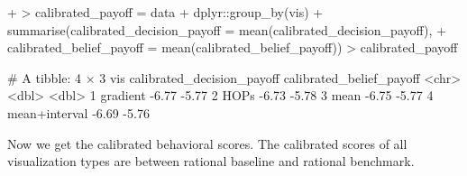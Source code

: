 \documentclass{article}
\begin{document}
\begin{Schunk}
\begin{Sinput}
{+ }
> calibrated_payoff = data %>%
+   dplyr::group_by(vis) %>%
+   summarise(calibrated_decision_payoff = mean(calibrated_decision_payoff),
+             calibrated_belief_payoff = mean(calibrated_belief_payoff))
> calibrated_payoff
\end{Sinput}
\begin{Soutput}
# A tibble: 4 × 3
  vis           calibrated_decision_payoff calibrated_belief_payoff
  <chr>                              <dbl>                    <dbl>
1 gradient                           -6.77                    -5.77
2 HOPs                               -6.73                    -5.78
3 mean                               -6.75                    -5.77
4 mean+interval                      -6.69                    -5.76
\end{Soutput}
\end{Schunk}

Now we get the calibrated behavioral scores. The calibrated scores of all visualization types are between rational baseline and rational benchmark.
\end{document}
